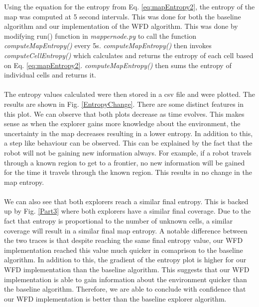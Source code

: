 \documentclass[a4paper,12pt]{article}
\begin{document}
			Using the equation for the entropy from Eq. \ref{eq:mapEntropy2}, the entropy of the map was computed at 5 second intervals. This was done for both the baseline algorithm and our implementation of the WFD algorithm. This was done by modifying run() function in \textit{mapper\textunderscore node.py} to call the function \textit{computeMapEntropy()} every 5s. \textit{computeMapEntropy()} then invokes \textit{computeCellEntropy()} which calculates and returns the entropy of each cell based on Eq. \ref{eq:mapEntropy2}. \textit{computeMapEntropy()} then sums the entropy of individual cells and returns it.
			\\
			\\
			The entropy values calculated were then stored in a csv file and were plotted. The results are shown in Fig. \ref{EntropyChange}. There are some distinct features in this plot. We can observe that both plots decrease as time evolves. This makes sense as when the explorer gains more knowledge about the environment, the uncertainty in the map decreases resulting in a lower entropy. In addition to this, a step like behaviour can be observed. This can be explained by the fact that the robot will not be gaining new information always. For example, if a robot travels through a known region to get to a frontier, no new information will be gained for the time it travels through the known region. This results in no change in the map entropy. 
			\\
			\\
			We can also see that both explorers reach a similar final entropy. This is backed up by Fig. \ref{Part3} where both explorers have a similar final coverage. Due to the fact that entropy is proportional to the number of unknown cells, a similar coverage will result in a similar final map entropy. A notable difference between the two traces is that despite reaching the same final entropy value, our WFD implementation reached this value much quicker in comaprison to the baseline algorithm. In addition to this, the gradient of the entropy plot is higher for our WFD implementation than the baseline algorithm. This suggests that our WFD implementation is able to gain information about the environment quicker than the baseline algorithm. Therefore, we are able to conclude with confidence that our WFD implementation is better than the baseline explorer algorithm. 
	
	
	

	
\end{document}
